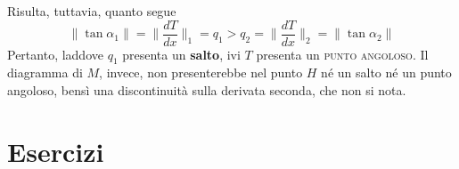 Risulta, tuttavia, quanto segue
\begin{equation*}
\big\| \tan \alpha_{1} \big\| = \biggl\| \frac{dT}{dx} \biggl\|_{1} = q_{1} > q_{2} = \biggl\| \frac{dT}{dx} \biggl\|_{2} = \big\| \tan \alpha_{2} \big\|
\end{equation*}
Pertanto, laddove $q_{1}$ presenta un \textbf{salto}, ivi $T$ presenta un \textsc{punto angoloso}. Il diagramma di $M$, invece, non presenterebbe nel punto $H$ né un salto né un punto angoloso, bensì una discontinuità sulla derivata seconda, che non si nota.

\clearpage
\section{Esercizi}
